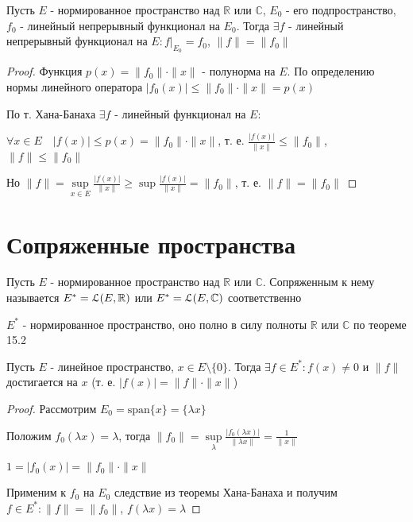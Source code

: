 \documentclass[a4paper,12pt]{report}
\begin{document}
\begin{cons}
Пусть $E$ - нормированное пространство над $\mathbb R$ или $\mathbb C$, $E_0$ - его подпространство, $f_0$ - линейный непрерывный функционал на $E_0$. Тогда $\exists f$ - линейный непрерывный функционал на $E\colon f|_{E_0}=f_0$, $\|f\|=\|f_0\|$
\end{cons}
\begin{proof}
Функция $p(x)=\|f_0\|\cdot\|x\|$ - полунорма на $E$. По определению нормы линейного оператора $|f_0(x)|\le\|f_0\|\cdot\|x\|=p(x)$

По т. Хана-Банаха $\exists f$ - линейный функционал на $E\colon$

\noindent$\forall x\in E\quad|f(x)|\le p(x)=\|f_0\|\cdot\|x\|$, т. е. $\displaystyle\frac{|f(x)|}{\|x\|}\le\|f_0\|$, $\|f\|\le\|f_0\|$

Но $\|f\|=\sup\limits_{x\in E}\displaystyle\frac{|f(x)|}{\|x\|}\ge\sup\displaystyle\frac{|f(x)|}{\|x\|}=\|f_0\|$, т. е. $\|f\|=\|f_0\|$
\end{proof}






\chapter{Сопряженные пространства}

\begin{df}
Пусть $E$ - нормированное пространство над $\mathbb R$ или $\mathbb C$. Сопряженным к нему называется $E^*=\EuScript L(E,\mathbb R)$ или $E^*=\EuScript L(E,\mathbb C)$ соответственно

$E^*$ - нормированное пространство, оно полно в силу полноты $\mathbb R$ или $\mathbb C$ по теореме 15.2
\end{df}
 


\begin{prop}
Пусть $E$ - линейное пространство, $x\in E\setminus\{0\}$. Тогда $\exists f\in E^*\colon f(x)\ne0$ и $\|f\|$ достигается на $x$ (т. е. $|f(x)|=\|f\|\cdot\|x\|$)
\end{prop}
\begin{proof}
Рассмотрим $E_0=\mathrm{span}\{x\}=\{\lambda x\}$

Положим $f_0(\lambda x)=\lambda$, тогда $\|f_0\|=\sup\limits_{\lambda}\displaystyle\frac{|f_0(\lambda x)|}{\|\lambda x\|}=\displaystyle\frac{1}{\|x\|}$

$1=|f_0(x)|=\|f_0\|\cdot\|x\|$

Применим к $f_0$ на $E_0$ следствие из теоремы Хана-Банаха и получим $f\in E^*\colon\|f\|=\|f_0\|$, $f(\lambda x)=\lambda$
\end{proof}
 
\end{document}
